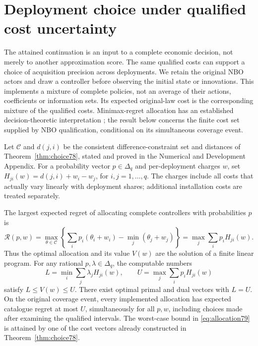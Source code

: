 \section{Deployment choice under qualified cost uncertainty}\label{sec:allocation79}
The attained continuation is an input to a complete economic decision, not merely to another approximation score. The same qualified costs can support a choice of acquisition precision across deployments. We retain the original NBO actors and draw a controller before observing the initial state or innovations. This implements a mixture of complete policies, not an average of their actions, coefficients or information sets. Its expected original-law cost is the corresponding mixture of the qualified costs. Minimax-regret allocation has an established decision-theoretic interpretation \citep{manski2004}; the result below concerns the finite cost set supplied by NBO qualification, conditional on its simultaneous coverage event.

Let $\mathcal C$ and $d(j,i)$ be the consistent difference-constraint set and distances of Theorem~\ref{thm:choice78}, stated and proved in the Numerical and Development Appendix. For a probability vector $p\in\Delta_q$ and per-deployment charges $w$, set $H_{ji}(w)=d(j,i)+w_i-w_j$, for $i,j=1,\ldots,q$. The charges include all costs that actually vary linearly with deployment shares; additional installation costs are treated separately.

\begin{theorem}\label{thm:allocation79}
The largest expected regret of allocating complete controllers with probabilities $p$ is
\begin{equation}\label{eq:allocation79}
 \mathcal R(p,w)=\max_{\theta\in\mathcal C}
 \left\{\sum_i p_i(\theta_i+w_i)-\min_j(\theta_j+w_j)\right\}
 =\max_j\sum_i p_iH_{ji}(w).
\end{equation}
Thus the optimal allocation and its value $V(w)$ are the solution of a finite linear program. For any rational $p,\lambda\in\Delta_q$, the computable numbers
\[
 L=\min_i\sum_j\lambda_jH_{ji}(w),\qquad
 U=\max_j\sum_i p_iH_{ji}(w)
\]
satisfy $L\le V(w)\le U$. There exist optimal primal and dual vectors with $L=U$. On the original coverage event, every implemented allocation has expected catalogue regret at most $U$, simultaneously for all $p,w$, including choices made after examining the qualified intervals. The worst-case bound in \eqref{eq:allocation79} is attained by one of the cost vectors already constructed in Theorem~\ref{thm:choice78}.
\end{theorem}

